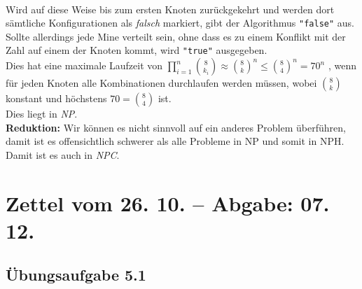 \documentclass{article}
\begin{document}
\\
Wird auf diese Weise bis zum ersten Knoten zurückgekehrt und werden dort sämtliche Konfigurationen als \textit{falsch} markiert, gibt der Algorithmus \texttt{"false"} aus.
Sollte allerdings jede Mine verteilt sein, ohne dass es zu einem Konflikt mit der Zahl auf einem der Knoten kommt, wird \texttt{"true"} ausgegeben.\\
Dies hat eine maximale Laufzeit von $\prod_{i=1}^n \binom{8}{k_i} \approx \binom{8}{k}^n \leq \binom{8}{4}^n = 70^n$ , wenn für jeden Knoten alle Kombinationen durchlaufen werden müssen, wobei $\binom{8}{k}$ konstant und höchstens $70 = \binom{8}{4}$ ist.\\
Dies liegt in \textit{NP}.
\vspace{1cm}\-\\
\textbf{Reduktion:} Wir können es nicht sinnvoll auf ein anderes Problem überführen, damit ist es offensichtlich schwerer als alle Probleme in NP und somit in NPH.
Damit ist es auch in \textit{NPC}.

\newpage
\section*{Zettel vom 26. 10. -- Abgabe: 07. 12.}
\subsection*{Übungsaufgabe 5.1}
\label{ssec:5.1}
\begin{flushright}
\begin{Large}
[~~~~\string| ~~4~]
\end{Large}
\end{flushright}
\end{document}
